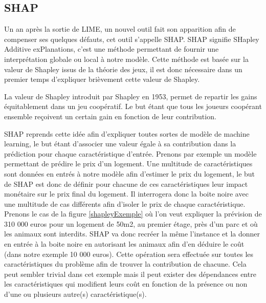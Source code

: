 \subsection{SHAP}
Un an après la sortie de LIME, un nouvel outil fait son apparition afin de compenser ses quelques défauts, cet outil s'appelle SHAP. SHAP signifie SHapley Additive exPlanations, c'est une méthode permettant de fournir une interprétation globale ou local à notre modèle. Cette méthode est basée sur la valeur de Shapley issus de la théorie des jeux, il est donc nécessaire dans un premier temps d'expliquer brièvement cette valeur de Shapley.\par
La valeur de Shapley introduit par Shapley en 1953, permet de repartir les gains équitablement dans un jeu coopératif. Le but étant que tous les joueurs coopérant ensemble reçoivent un certain gain en fonction de leur contribution.\par
SHAP reprends cette idée afin d'expliquer toutes sortes de modèle de machine learning, le but étant d'associer une valeur égale à sa contribution dans la prédiction pour chaque caractéristique d'entrée. Prenons par exemple un modèle permettant de prédire le prix d'un logement. Une multitude de caractéristiques sont données en entrés à notre modèle afin d'estimer le prix du logement, le but de SHAP est donc de définir pour chacune de ces caractéristiques leur impact monétaire sur le prix final du logement. Il interrogera donc la boite noire avec une multitude de cas différents afin d'isoler le prix de chaque caractéristique. Prenons le cas de la figure \ref{shapleyExemple} où l'on veut expliquer la prévision de 310 000 euros pour un logement de 50m2, au premier étage, près d'un parc et où les animaux sont interdits. SHAP va donc recréer la même l'instance et la donner en entrée à la boite noire en autorisant les animaux afin d'en déduire le coût (dans notre exemple 10 000 euros). Cette opération sera effectuée sur toutes les caractéristiques du problème afin de trouver la contribution de chacune. Cela peut sembler trivial dans cet exemple mais il peut exister des dépendances entre les caractéristiques qui modifient leurs coût en fonction de la présence ou non d'une ou plusieurs autre(s) caractéristique(s).
